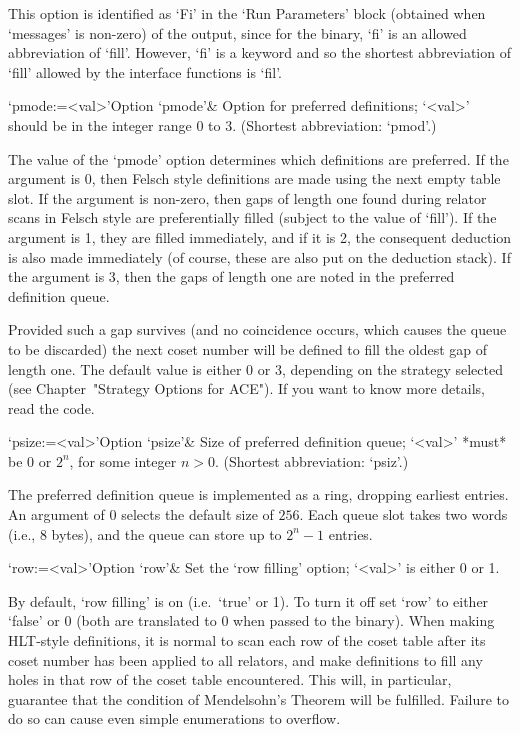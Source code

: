 This option is identified as `Fi' in the  \lq{}Run  Parameters'  block
(obtained when `messages' is non-zero) of the {\ACE} output, since for
the {\ACE} binary, `fi' is an allowed abbreviation of `fill'. However,
`fi' is a {\GAP} keyword and so the shortest  abbreviation  of  `fill'
allowed by the interface functions is `fil'.

\>`pmode:=<val>'{Option `pmode'}&
Option for preferred definitions; `<val>' should  be  in  the  integer
range 0 to 3. (Shortest abbreviation: `pmod'.)

The  value of  the  `pmode' option  determines  which definitions  are
preferred.  If  the argument is  0, then Felsch style  definitions are
made using  the next empty table  slot.  If the  argument is non-zero,
then gaps of length one found during relator scans in Felsch style are
preferentially  filled  (subject to  the  value  of  `fill').  If  the
argument  is 1,  they are  filled  immediately, and  if it  is 2,  the
consequent deduction  is also made  immediately (of course,  these are
also put on the deduction stack).  If the argument is 3, then the gaps
of length one are noted in the preferred definition queue.

Provided such a gap survives (and no coincidence occurs, which  causes
the queue to be discarded) the next coset number will  be  defined  to
fill the oldest gap of length one. The default value is either 0 or 3,
depending on the strategy selected (see Chapter~"Strategy Options  for
ACE"). If you want to know more details, read the code.


\>`psize:=<val>'{Option `psize'}&
Size of preferred definition queue; `<val>' *must* be 0 or $2^n$,  for
some integer $n>0$. (Shortest abbreviation: `psiz'.)

The  preferred definition  queue is  implemented as  a  ring, dropping
earliest entries. An argument of 0 selects  the default size of $256$.
Each  queue slot takes two words (i.e., 8 bytes),  and the  queue  can
store up to $2^n-1$ entries.

\enditems


\beginitems

\>`row:=<val>'{Option `row'}&
Set the \lq{}row filling' option; `<val>' is either 0 or 1.

By default, \lq{}row filling' is on (i.e.~`true' or 1). To turn it off
set `row' to either `false' or 0 (both are translated to 0 when passed
to  the {\ACE}  binary).   When making  HLT-style  definitions, it  is
normal to scan each row of  the coset table after its coset number has
been applied to  all relators, and make definitions  to fill any holes
in that row of the  coset table encountered. This will, in particular,
guarantee  that   the  condition  of  Mendelsohn's   Theorem  will  be
fulfilled.  Failure  to do  so can cause  even simple  enumerations to
overflow.

